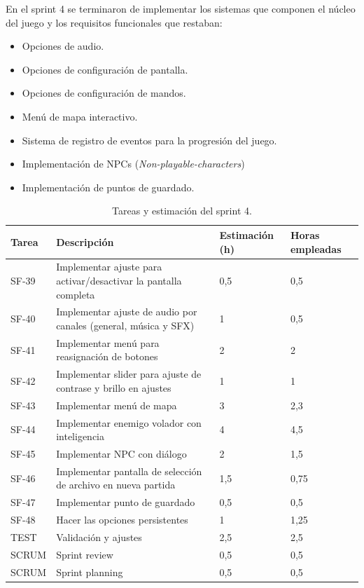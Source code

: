 En el sprint 4 se terminaron de implementar los sistemas que componen el núcleo del juego y los requisitos funcionales que restaban:
\begin{itemize}
    \item Opciones de audio.
    \item Opciones de configuración de pantalla.
    \item Opciones de configuración de mandos.
    \item Menú de mapa interactivo.
    \item Sistema de registro de eventos para la progresión del juego.
    \item Implementación de NPCs (\textit{Non-playable-characters})
    \item Implementación de puntos de guardado.
\end{itemize}

\begin{table}[!ht]
    \centering
    \begin{tabular}{|l|p{8cm}|p{2cm}|p{2cm}|}
    \hline
        Tarea & Descripción & Estimación (h) & Horas empleadas \\ \hline
        SF-39 & Implementar ajuste para activar/desactivar la pantalla completa & 0,5 & 0,5 \\ \hline
        SF-40 & Implementar ajuste de audio por canales (general, música y SFX) & 1 & 0,5 \\ \hline
        SF-41 & Implementar menú para reasignación de botones & 2 & 2 \\ \hline
        SF-42 & Implementar slider para ajuste de contrase y brillo en ajustes & 1 & 1 \\ \hline
        SF-43 & Implementar menú de mapa & 3 & 2,3 \\ \hline
        SF-44 & Implementar enemigo volador con inteligencia & 4 & 4,5 \\ \hline
        SF-45 & Implementar NPC con diálogo & 2 & 1,5 \\ \hline
        SF-46 & Implementar pantalla de selección de archivo en nueva partida & 1,5 & 0,75 \\ \hline
        SF-47 & Implementar punto de guardado & 0,5 & 0,5 \\ \hline
        SF-48 & Hacer las opciones persistentes & 1 & 1,25 \\ \hline
        TEST & Validación y ajustes & 2,5 & 2,5 \\ \hline
        SCRUM & Sprint review & 0,5 & 0,5 \\ \hline
        SCRUM & Sprint planning & 0,5 & 0,5 \\ \hline
    \end{tabular}
    \caption{Tareas y estimación del sprint 4.}
    \label{tab:sprint4task}
\end{table}

